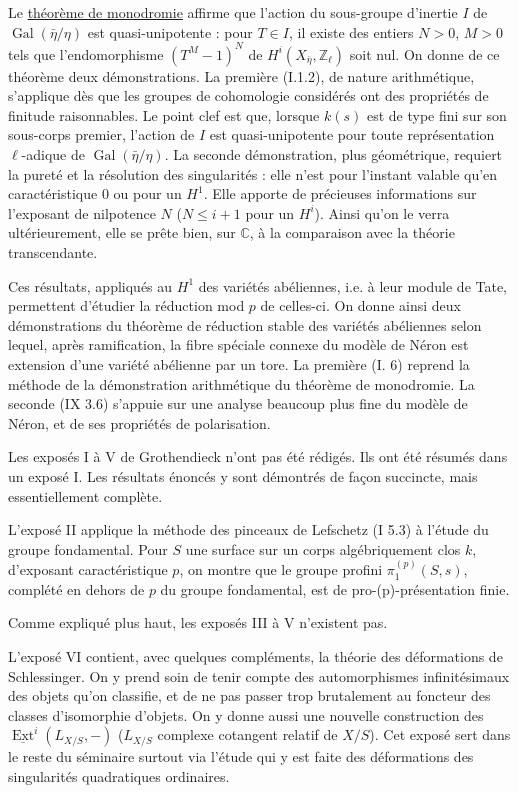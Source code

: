 Le \underline{théorème de monodromie} affirme que l'action du sous-groupe
d'inertie $I$ de $\operatorname{Gal}(\bar\eta/\eta)$ est quasi-unipotente :
pour $T\in I$, il existe des entiers $N>0$, $M>0$ tels que
l'endomorphisme $(T^M-1)^N$ de $H^i(X_{\bar\eta},\mathbb Z_\ell)$ soit nul.
On donne de ce théorème deux démonstrations. La première (I.1.2), de
nature arithmétique, s'applique dès que les groupes de cohomologie
considérés ont des propriétés de finitude raisonnables. Le point clef
est que, lorsque $k(s)$ est de type fini sur son sous-corps premier,
l'action de $I$ est quasi-unipotente pour toute représentation
$\ell$-adique de $\operatorname{Gal}(\bar\eta/\eta)$. La seconde
démonstration, plus géométrique, requiert la pureté et la résolution
des singularités : elle n'est pour l'instant valable qu'en caractéristique
$0$ ou pour un $H^1$. Elle apporte de précieuses informations sur
l'exposant de nilpotence $N$ ($N\leq i+1$ pour un $H^i$). Ainsi qu'on le
verra ultérieurement, elle se prête bien, sur $\mathbb C$, à la comparaison
avec la théorie transcendante.

Ces résultats, appliqués au $H^1$ des variétés abéliennes, i.e. à leur
module de Tate, permettent d'étudier la réduction mod $p$ de celles-ci.
On donne ainsi deux démonstrations du théorème de réduction stable
des variétés abéliennes selon lequel, après ramification, la fibre
spéciale connexe du modèle de Néron est extension d'une variété abélienne
par un tore. La première (I. 6) reprend la méthode de la démonstration
arithmétique du théorème de monodromie. La seconde (IX 3.6) s'appuie sur
une analyse beaucoup plus fine du modèle de Néron, et de ses propriétés
de polarisation.

Les exposés I à V de Grothendieck n'ont pas été rédigés. Ils ont été
résumés dans un exposé I. Les résultats énoncés y sont démontrés de
façon succincte, mais essentiellement complète.

L'exposé II applique la méthode des pinceaux de Lefschetz (I 5.3) à
l'étude du groupe fondamental. Pour $S$ une surface sur un corps
algébriquement clos $k$, d'exposant caractéristique $p$, on montre que
le groupe profini $\pi_1^{(p)}(S,s)$, complété en dehors de $p$ du groupe
fondamental, est de pro-(p)-présentation finie.

Comme expliqué plus haut, les exposés III à V n'existent pas.

L'exposé VI contient, avec quelques compléments, la théorie des
déformations de Schlessinger. On y prend soin de tenir compte des
automorphismes infinitésimaux des objets qu'on classifie, et de ne pas
passer trop brutalement au foncteur des classes d'isomorphie d'objets.
On y donne aussi une nouvelle construction des
$\underline{\operatorname{Ext}}^i(L_{X/S},-)$
($L_{X/S}$ complexe cotangent relatif de $X/S$). Cet exposé sert dans
le reste du séminaire surtout via l'étude qui y est faite des
déformations des singularités quadratiques ordinaires.

